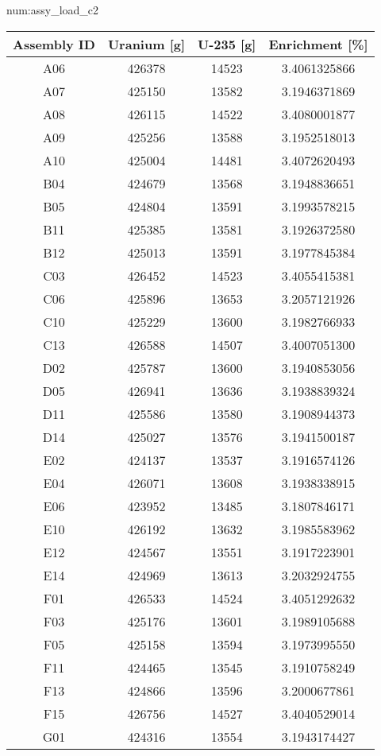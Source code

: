 \begin{numitem}{num:assy_load_c2}
 \begin{center}
  \begin{longtable}{c c c c}
    \toprule
    Assembly ID & Uranium [g] & U-235 [g] & Enrichment [\%] \\
    \midrule
    \midrule
A06&426378&14523&3.4061325866\\
A07&425150&13582&3.1946371869\\
A08&426115&14522&3.4080001877\\
A09&425256&13588&3.1952518013\\
A10&425004&14481&3.4072620493\\
B04&424679&13568&3.1948836651\\
B05&424804&13591&3.1993578215\\
B11&425385&13581&3.1926372580\\
B12&425013&13591&3.1977845384\\
C03&426452&14523&3.4055415381\\
C06&425896&13653&3.2057121926\\
C10&425229&13600&3.1982766933\\
C13&426588&14507&3.4007051300\\
D02&425787&13600&3.1940853056\\
D05&426941&13636&3.1938839324\\
D11&425586&13580&3.1908944373\\
D14&425027&13576&3.1941500187\\
E02&424137&13537&3.1916574126\\
E04&426071&13608&3.1938338915\\
E06&423952&13485&3.1807846171\\
E10&426192&13632&3.1985583962\\
E12&424567&13551&3.1917223901\\
E14&424969&13613&3.2032924755\\
F01&426533&14524&3.4051292632\\
F03&425176&13601&3.1989105688\\
F05&425158&13594&3.1973995550\\
F11&424465&13545&3.1910758249\\
F13&424866&13596&3.2000677861\\
F15&426756&14527&3.4040529014\\
G01&424316&13554&3.1943174427\\

\end{longtable}
\end{center}
\end{numitem}
